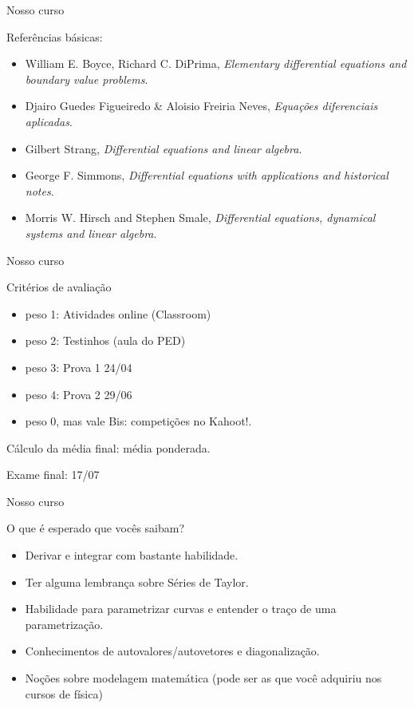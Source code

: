 \documentclass[11pt]{beamer}
\begin{document}
\begin{frame}[t]{Nosso curso}

Referências básicas:
\begin{itemize}
\item William E. Boyce, Richard C. DiPrima, {\it Elementary differential equations and boundary value problems}.
\item Djairo Guedes Figueiredo \& Aloisio Freiria Neves, {\it Equações diferenciais aplicadas}. 
\item Gilbert Strang, {\it Differential equations and linear algebra}.
\item George F. Simmons, {\it Differential equations with applications and historical notes}. 
\item Morris W. Hirsch and Stephen Smale, {\it Differential equations, dynamical systems and linear algebra}. 
\end{itemize}


\end{frame}



\begin{frame}[t]{Nosso curso}

Critérios de avaliação \pause 

\begin{itemize}
\item peso 1: Atividades online (Classroom) \pause 
\item peso 2: Testinhos (aula do PED) \pause 
\item peso 3: Prova 1 24/04 \pause 
\item peso 4: Prova 2 29/06 \pause 
\item peso 0, mas vale Bis: competições no Kahoot!. \pause 
\end{itemize}

Cálculo da média final: média ponderada. \pause 

Exame final: 17/07
\end{frame}


\begin{frame}[t]{Nosso curso}

O que é esperado que vocês saibam? \pause 

\begin{itemize}
\item Derivar e integrar com bastante habilidade. \pause 
\item Ter alguma lembrança sobre Séries de Taylor. \pause 
\item Habilidade para parametrizar curvas e entender o traço de uma parametrização. \pause 
\item Conhecimentos de autovalores/autovetores e diagonalização. \pause 
\item Noções sobre modelagem matemática (pode ser as que você adquiriu nos cursos de física) \pause 
\end{itemize}

\end{frame}
\end{document}
